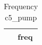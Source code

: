 \begin{table}[htbp]\centering
\def\sym#1{\ifmmode^{#1}\else\(^{#1}\)\fi}
\caption{Frequency c5\_pump \label{tab:"label"}}
\begin{tabular*}{0.9\hsize}{@{\hskip\tabcolsep\extracolsep\fill}l*{1}{c}}
\toprule
                                &     freq\\
\midrule
\bottomrule
\end{tabular*}
\end{table}

